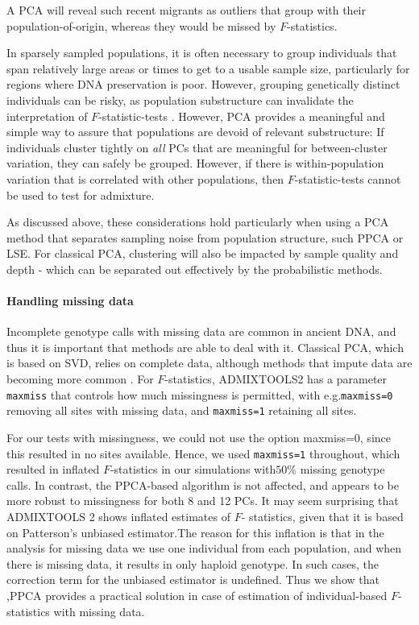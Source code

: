 \documentclass[12pt, letterpaper]{article}
\begin{document}
A PCA will reveal such recent migrants as outliers that group with their population-of-origin, whereas they would be missed by $F$-statistics.

In sparsely sampled populations, it is often necessary to group individuals that span relatively large areas or times to get to a usable sample size, particularly for regions where DNA preservation is poor. However, grouping genetically distinct individuals can be risky, as population substructure can invalidate the interpretation of $F$-statistic-tests \cite{peter_admixture_2016}. However, PCA provides a meaningful and simple way to assure that populations are devoid of relevant substructure: If individuals  cluster tightly on \emph{all} PCs that are meaningful for between-cluster variation, they can safely be grouped. However, if there is within-population variation that is correlated with other populations, then $F$-statistic-tests cannot be used to test for admixture. 

As discussed above, these considerations hold particularly when using a PCA method that separates sampling noise from population structure, such PPCA or LSE. For classical PCA, clustering will also be impacted by sample quality and depth - which can be separated out effectively by the probabilistic methods.



\paragraph{Handling missing data}
Incomplete genotype calls with missing data are common in ancient DNA, and thus it is important that methods are able to deal with it. Classical PCA, which is based on SVD, relies on complete data, although methods that impute data are becoming more common \citep{meisner_large-scale_2021}. For $F$-statistics, ADMIXTOOLS2 has a parameter \texttt{maxmiss} that controls how much missingness is permitted, with e.g.\texttt{maxmiss=0} removing all sites with missing data, and \texttt{maxmiss=1} retaining all sites.

For our tests with missingness, we could not use the option maxmiss=0, since this resulted in no sites available. Hence, we used \texttt{maxmiss=1} throughout, which resulted in inflated $F$-statistics in our simulations with$50\%$ missing genotype calls. In contrast, the  PPCA-based algorithm is not affected, and appears to be more robust to missingness for both 8 and 12 PCs. It may seem surprising that ADMIXTOOLS 2 shows inflated estimates of $F$- statistics, given that it is based on Patterson's unbiased estimator.The reason for this inflation is that in the analysis for missing data we use one individual from each population, and when there is missing data, it results in only haploid genotype. In such cases, the correction term for the unbiased estimator is undefined. Thus we show that ,PPCA provides a practical solution in case of estimation of individual-based $F$-statistics with missing data. 
\end{document}
